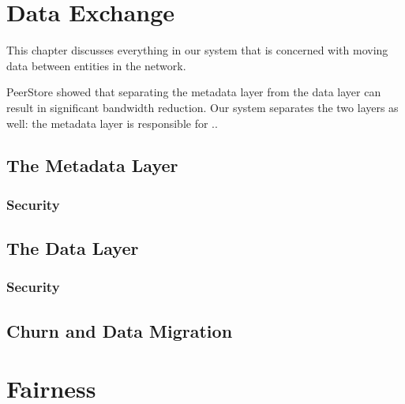 \documentclass[12pt]{report}
\begin{document}
\section{Data Exchange}

This chapter discusses everything in our system that is concerned with moving data between entities in the network.

PeerStore showed that separating the metadata layer from the data layer can result in significant bandwidth reduction. Our system separates the two layers as well: the metadata layer is responsible for .. 

\subsection{The Metadata Layer}


\subsubsection{Security}


\subsection{The Data Layer}


\subsubsection{Security}



\subsection{Churn and Data Migration}


\section{Fairness} \label{sec:challenge}
\end{document}
